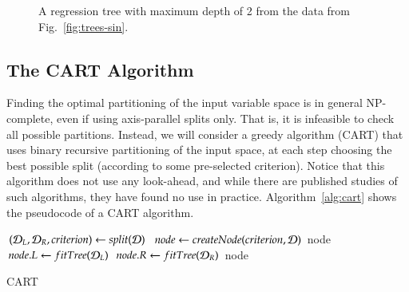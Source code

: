 \begin{refsection}
\begin{figure}[htbp]
\caption{A regression tree with maximum depth of 2 from the data from Fig.~\ref{fig:trees-sin}.}
\label{fig:fig:trees-sin-2}
\end{figure}

\subsection*{The CART Algorithm}

Finding the optimal partitioning of the input variable space is in general NP-complete, even if using axis-parallel splits only. That is, it is infeasible to check all possible partitions. Instead, we will consider a greedy algorithm (CART) that uses binary recursive partitioning of the input space, at each step choosing the best possible split (according to some pre-selected criterion). Notice that this algorithm does not use any look-ahead, and while there are published studies of such algorithms, they have found no use in practice. Algorithm~\ref{alg:cart} shows the pseudocode of a CART algorithm.

\begin{algorithm}
\begin{algorithmic}[1]
\State $(\mathcal{D}_L, \mathcal{D}_R, criterion) \gets split(\mathcal{D})$
\State $node \gets createNode(criterion, \mathcal{D})$
 \Return node \EndIf
\State $node.L \gets fitTree(\mathcal{D}_L)$
\State $node.R \gets fitTree(\mathcal{D}_R)$
\State \Return node
\EndProcedure
\end{algorithmic}
\caption{CART}\label{alg:cart}
\end{algorithm}


\end{refsection}
